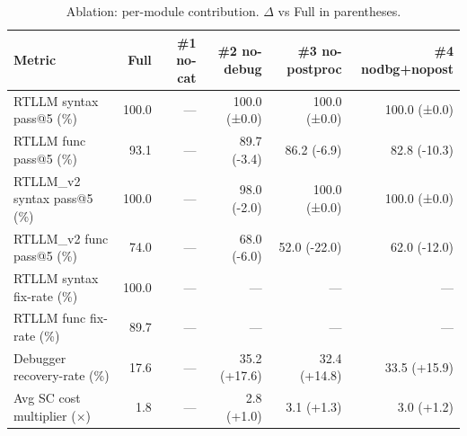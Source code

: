 \begin{table}[t]
\centering
\caption{Ablation: per-module contribution. $\Delta$ vs Full in parentheses.}
\label{tab:ablation}
\begin{tabular}{lrrrrr}
\toprule
Metric & Full & \#1 no-cat & \#2 no-debug & \#3 no-postproc & \#4 nodbg+nopost \\
\midrule
RTLLM syntax pass@5 (\%) & 100.0 & — & 100.0 {\footnotesize (±0.0)} & 100.0 {\footnotesize (±0.0)} & 100.0 {\footnotesize (±0.0)} \\
RTLLM func pass@5 (\%) & 93.1 & — & 89.7 {\footnotesize (-3.4)} & 86.2 {\footnotesize (-6.9)} & 82.8 {\footnotesize (-10.3)} \\
RTLLM\_v2 syntax pass@5 (\%) & 100.0 & — & 98.0 {\footnotesize (-2.0)} & 100.0 {\footnotesize (±0.0)} & 100.0 {\footnotesize (±0.0)} \\
RTLLM\_v2 func pass@5 (\%) & 74.0 & — & 68.0 {\footnotesize (-6.0)} & 52.0 {\footnotesize (-22.0)} & 62.0 {\footnotesize (-12.0)} \\
RTLLM syntax fix-rate (\%) & 100.0 & — & — & — & — \\
RTLLM func fix-rate (\%) & 89.7 & — & — & — & — \\
Debugger recovery-rate (\%) & 17.6 & — & 35.2 {\footnotesize (+17.6)} & 32.4 {\footnotesize (+14.8)} & 33.5 {\footnotesize (+15.9)} \\
Avg SC cost multiplier ($\times$) & 1.8 & — & 2.8 {\footnotesize (+1.0)} & 3.1 {\footnotesize (+1.3)} & 3.0 {\footnotesize (+1.2)} \\
\bottomrule
\end{tabular}
\end{table}
